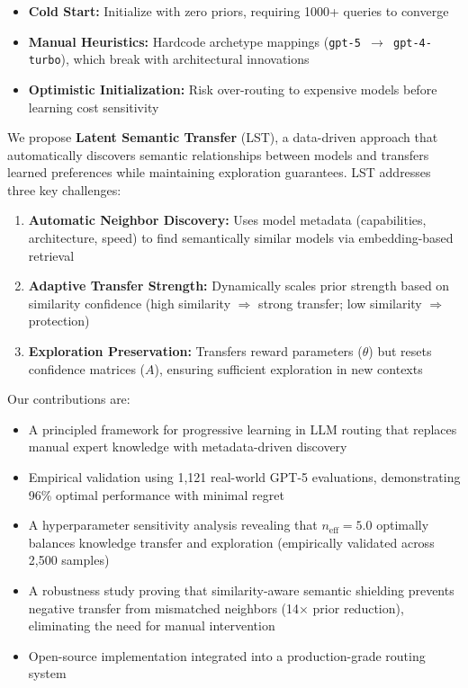 \documentclass[sigconf,nonacm]{acmart}
\begin{document}
\begin{itemize}
    \item \textbf{Cold Start:} Initialize with zero priors, requiring 1000+ queries to converge~\cite{chapelle2011empirical}
    \item \textbf{Manual Heuristics:} Hardcode archetype mappings (\texttt{gpt-5 $\rightarrow$ gpt-4-turbo}), which break with architectural innovations
    \item \textbf{Optimistic Initialization:} Risk over-routing to expensive models before learning cost sensitivity
\end{itemize}

We propose \textbf{Latent Semantic Transfer} (LST), a data-driven approach that automatically discovers semantic relationships between models and transfers learned preferences while maintaining exploration guarantees. LST addresses three key challenges:

\begin{enumerate}
    \item \textbf{Automatic Neighbor Discovery:} Uses model metadata (capabilities, architecture, speed) to find semantically similar models via embedding-based retrieval
    \item \textbf{Adaptive Transfer Strength:} Dynamically scales prior strength based on similarity confidence (high similarity $\Rightarrow$ strong transfer; low similarity $\Rightarrow$ protection)
    \item \textbf{Exploration Preservation:} Transfers reward parameters ($\theta$) but resets confidence matrices ($A$), ensuring sufficient exploration in new contexts
\end{enumerate}

Our contributions are:
\begin{itemize}
    \item A principled framework for progressive learning in LLM routing that replaces manual expert knowledge with metadata-driven discovery
    \item Empirical validation using 1,121 real-world GPT-5 evaluations, demonstrating 96\% optimal performance with minimal regret
    \item A hyperparameter sensitivity analysis revealing that $n_{\text{eff}} = 5.0$ optimally balances knowledge transfer and exploration (empirically validated across 2,500 samples)
    \item A robustness study proving that similarity-aware semantic shielding prevents negative transfer from mismatched neighbors (14$\times$ prior reduction), eliminating the need for manual intervention
    \item Open-source implementation integrated into a production-grade routing system
\end{itemize}
\end{document}
